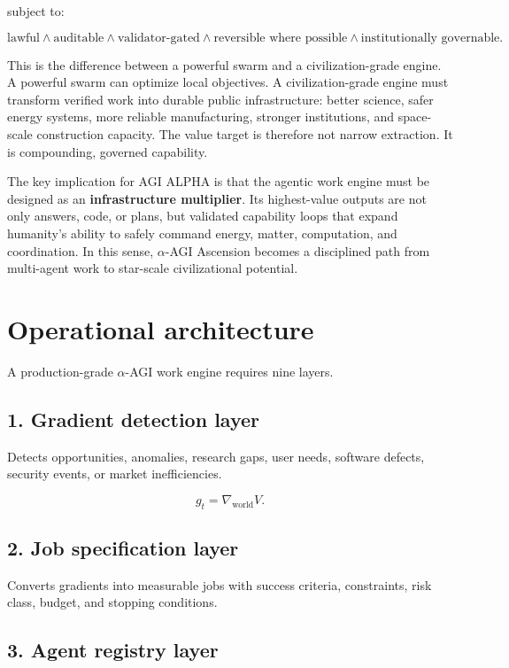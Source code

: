 \documentclass[
  11pt,
]{article}
\begin{document}
subject to:

\[
\text{lawful}\land\text{auditable}\land\text{validator-gated}\land
\text{reversible where possible}\land\text{institutionally governable}.
\]

This is the difference between a powerful swarm and a civilization-grade
engine. A powerful swarm can optimize local objectives. A
civilization-grade engine must transform verified work into durable
public infrastructure: better science, safer energy systems, more
reliable manufacturing, stronger institutions, and space-scale
construction capacity. The value target is therefore not narrow
extraction. It is compounding, governed capability.

The key implication for AGI ALPHA is that the agentic work engine must be
designed as an \textbf{infrastructure multiplier}. Its highest-value
outputs are not only answers, code, or plans, but validated capability
loops that expand humanity's ability to safely command energy, matter,
computation, and coordination. In this sense, $\alpha$-AGI Ascension
becomes a disciplined path from multi-agent work to star-scale
civilizational potential.

\section{Operational architecture}\label{operational-architecture}

A production-grade $\alpha$-AGI work engine requires nine layers.

\subsection{1. Gradient detection layer}\label{gradient-detection-layer}

Detects opportunities, anomalies, research gaps, user needs, software
defects, security events, or market inefficiencies.

\[
g_t=\nabla_{\text{world}}V.
\]

\subsection{2. Job specification layer}\label{job-specification-layer}

Converts gradients into measurable jobs with success criteria,
constraints, risk class, budget, and stopping conditions.

\subsection{3. Agent registry layer}\label{agent-registry-layer}
\end{document}
